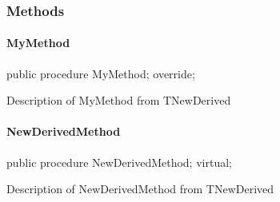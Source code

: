 \documentclass{report}
\newif\ifpdf
\begin{document}
\subsubsection*{\large{\textbf{Methods}}\normalsize\hspace{1ex}\hfill}
\paragraph*{MyMethod}\hspace*{\fill}

\label{ok_inherited_members_hide_ancestor.TNewDerived-MyMethod}
\begin{list}{}{
\setlength{\itemindent}{0cm}
\setlength{\listparindent}{0cm}
\setlength{\leftmargin}{\evensidemargin}
\addtolength{\leftmargin}{\tmplength}
\settowidth{\labelsep}{X}
\addtolength{\leftmargin}{\labelsep}
\setlength{\labelwidth}{\tmplength}
}
\item[\textbf{Declaration}\hfill]
\ifpdf
\begin{flushleft}
\fi
\begin{ttfamily}
public procedure MyMethod; override;\end{ttfamily}

\ifpdf
\end{flushleft}
\fi

\par
\item[\textbf{Description}]
Description of MyMethod from TNewDerived

\end{list}
\paragraph*{NewDerivedMethod}\hspace*{\fill}

\label{ok_inherited_members_hide_ancestor.TNewDerived-NewDerivedMethod}
\begin{list}{}{
\setlength{\itemindent}{0cm}
\setlength{\listparindent}{0cm}
\setlength{\leftmargin}{\evensidemargin}
\addtolength{\leftmargin}{\tmplength}
\settowidth{\labelsep}{X}
\addtolength{\leftmargin}{\labelsep}
\setlength{\labelwidth}{\tmplength}
}
\item[\textbf{Declaration}\hfill]
\ifpdf
\begin{flushleft}
\fi
\begin{ttfamily}
public procedure NewDerivedMethod; virtual;\end{ttfamily}

\ifpdf
\end{flushleft}
\fi

\par
\item[\textbf{Description}]
Description of NewDerivedMethod from TNewDerived

\end{list}
\end{document}
